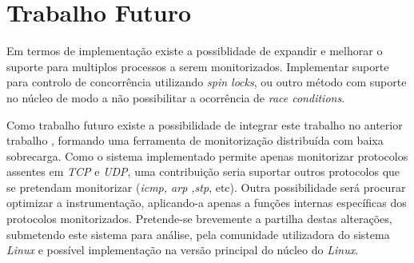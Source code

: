 \section{Trabalho Futuro}

Em termos de implementação existe a possiblidade de expandir e melhorar o suporte para multiplos processos a serem monitorizados.
Implementar suporte para controlo de concorrência utilizando \textit{spin locks}, ou outro método com suporte no núcleo de modo a não possibilitar a ocorrência de \textit{race conditions}.

Como trabalho futuro existe a possibilidade de integrar este trabalho no anterior trabalho \cite{duarte10,Farruca:2009}, formando uma ferramenta de monitorização distribuída com baixa sobrecarga.
 Como o sistema implementado permite apenas monitorizar protocolos assentes em \textit{TCP} e \textit{UDP}, uma contribuição seria suportar outros protocolos que se pretendam monitorizar (\textit{icmp, arp ,stp}, etc).
 Outra possibilidade será procurar optimizar a instrumentação, aplicando-a apenas a funções internas específicas dos protocolos monitorizados.
 Pretende-se brevemente a partilha destas alterações, submetendo este sistema para análise, pela comunidade utilizadora do sistema \textit{Linux} e possível implementação na versão principal do núcleo do \textit{Linux}.


